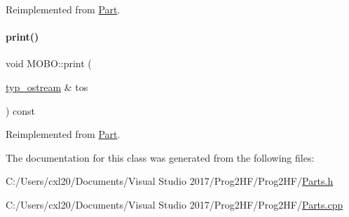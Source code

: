 Reimplemented from \mbox{\hyperlink{class_part_aa602d876151b63db72cf8f666847a8cd}{Part}}.

\mbox{\label{class_m_o_b_o_a3dd7e36103afbb4b6c09b65975317b9c}} 
\paragraph{\texorpdfstring{print()}{print()}\hspace{0.1cm}{\footnotesize\ttfamily [4/4]}}
{\footnotesize\ttfamily void M\+O\+B\+O\+::print (\begin{DoxyParamCaption}\item[{\mbox{\hyperlink{structtyp__ostream}{typ\+\_\+ostream}} \&}]{tos }\end{DoxyParamCaption}) const\hspace{0.3cm}{\ttfamily [virtual]}}



Reimplemented from \mbox{\hyperlink{class_part_ab6396030e8b7a724731a8b54bd4942fc}{Part}}.



The documentation for this class was generated from the following files\+:\begin{DoxyCompactItemize}
\item 
C\+:/\+Users/cxl20/\+Documents/\+Visual Studio 2017/\+Prog2\+H\+F/\+Prog2\+H\+F/\mbox{\hyperlink{_parts_8h}{Parts.\+h}}\item 
C\+:/\+Users/cxl20/\+Documents/\+Visual Studio 2017/\+Prog2\+H\+F/\+Prog2\+H\+F/\mbox{\hyperlink{_parts_8cpp}{Parts.\+cpp}}\end{DoxyCompactItemize}
